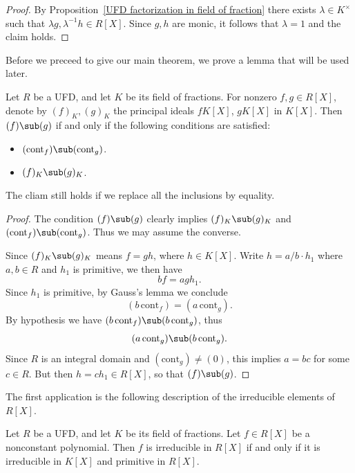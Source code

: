 \begin{proof}
By Proposition~\ref{UFD factorization in field of fraction} there exists $\lambda\in K^\times$ such that $\lambda g,\lambda^{-1}h\in R[X]$. Since $g,h$ are monic, it follows that $\lambda=1$ and the claim holds.
\end{proof}
Before we preceed to give our main theorem, we prove a lemma that will be used later.
\begin{lemma}\label{UFD inclusion of principal polynomial ideals iff}
Let $R$ be a UFD, and let $K$ be its field of fractions. For nonzero $f,g\in R[X]$, denote by $(f)_K,(g)_K$ the principal ideals $fK[X]$, $gK[X]$ in $K[X]$. Then $(f)\sub(g)$ if and only if the following conditions are satisfied:
\begin{itemize}
\item $(\mathrm{cont}_f)\sub(\mathrm{cont}_g)$.
\item $(f)_K\sub (g)_K$.
\end{itemize}
The cliam still holds if we replace all the inclusions by equality.
\end{lemma}
\begin{proof}
The condition $(f)\sub(g)$ clearly implies $(f)_K\sub(g)_K$ and $(\mathrm{cont}_f)\sub(\mathrm{cont}_g)$. Thus we may assume the converse.\par
Since $(f)_K\sub (g)_K$ means $f=gh$, where $h\in K[X]$. Write $h=a/b\cdot h_1$ where $a,b\in R$ and $h_1$ is primitive, we then have
\[bf=agh_1.\]
Since $h_1$ is primitive, by Gauss's lemma we conclude
\[(b\,\mathrm{cont}_f)=(a\,\mathrm{cont}_g).\]
By hypothesis we have $(b\,\mathrm{cont}_f)\sub(b\,\mathrm{cont}_g)$, thus
\[(a\,\mathrm{cont}_g)\sub(b\,\mathrm{cont}_g).\]
Since $R$ is an integral domain and $(\mathrm{cont}_g)\neq(0)$, this implies $a=bc$ for some $c\in R$. But then $h=ch_1\in R[X]$, so that $(f)\sub(g)$. 
\end{proof}
The first application is the following description of the irreducible elements
of $R[X]$.
\begin{proposition}\label{UFD irreducible in field of fraction iff}
Let $R$ be a UFD, and let $K$ be its field of fractions. Let $f\in R[X]$ be a nonconstant polynomial. Then $f$ is irreducible in $R[X]$ if and only if it is irreducible in $K[X]$ and primitive in $R[X]$.
\end{proposition}
